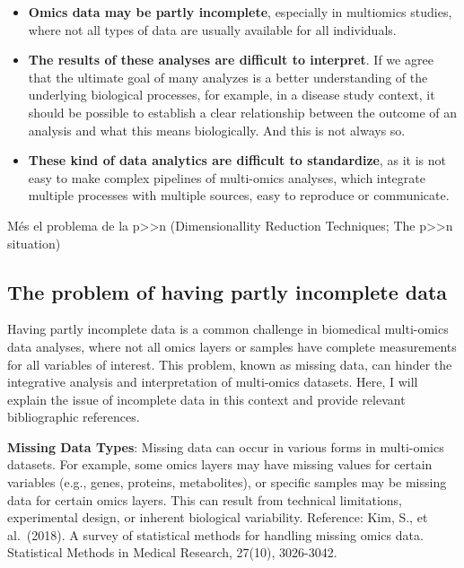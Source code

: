 \documentclass[a4paper, nobind]{templates/ociamthesis}
\begin{document}
\begin{itemize}
\item
  \textbf{Omics data may be partly incomplete}, especially in multiomics studies, where not all types of data are usually available for all individuals.
\item
  \textbf{The results of these analyses are difficult to interpret}. If we agree that the ultimate goal of many analyzes is a better understanding of the underlying biological processes, for example, in a disease study context, it should be possible to establish a clear relationship between the outcome of an analysis and what this means biologically. And this is not always so.
\item
  \textbf{These kind of data analytics are difficult to standardize}, as it is not easy to make complex pipelines of multi-omics analyses, which integrate multiple processes with multiple sources, easy to reproduce or communicate.
\end{itemize}

Més el problema de la p\textgreater\textgreater n (Dimensionallity Reduction Techniques; The p\textgreater\textgreater n situation)

\hypertarget{the-problem-of-having-partly-incomplete-data}{%
\subsection{The problem of having partly incomplete data}\label{the-problem-of-having-partly-incomplete-data}}

Having partly incomplete data is a common challenge in biomedical multi-omics data analyses, where not all omics layers or samples have complete measurements for all variables of interest. This problem, known as missing data, can hinder the integrative analysis and interpretation of multi-omics datasets. Here, I will explain the issue of incomplete data in this context and provide relevant bibliographic references.

\textbf{Missing Data Types}: Missing data can occur in various forms in multi-omics datasets. For example, some omics layers may have missing values for certain variables (e.g., genes, proteins, metabolites), or specific samples may be missing data for certain omics layers. This can result from technical limitations, experimental design, or inherent biological variability. Reference: Kim, S., et al.~(2018). A survey of statistical methods for handling missing omics data. Statistical Methods in Medical Research, 27(10), 3026-3042.
\end{document}
